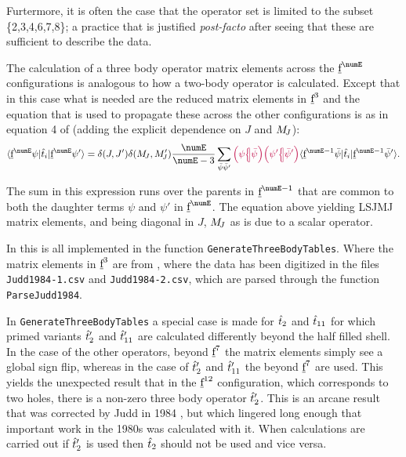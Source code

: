 \documentclass{article}
\newcommand{\codetext}[1]{{\color{BlueViolet} \texttt{#1}}}
\begin{document}
Furtermore, it is often the case that the operator set is limited to the subset \{2,3,4,6,7,8\}; a practice that is justified \textit{post-facto} after seeing that these are sufficient to describe the data.

The calculation of a three body operator matrix elements across the $\forb^{\numE}$ configurations is analogous to how a two-body operator is calculated. Except that in this case what is needed are the reduced matrix elements in $\underbar{$\text{f}$}^3$ and the equation that is used to propagate these across the other configurations is as in equation 4 of \cite{judd_three-particle_1966} (adding the explicit dependence on $J$ and $M_{\!{J}}$):
\begin{equation} 
	\braopket{\forb^{\numE}\psi}
		{\op{t}_i}
		{\forb^{\numE}\psi'} =
		\kronecker{J}{J'}
		\kronecker{\Msub{J}}{\Msub{J}'} 
		\frac{\numE}{\numE-3} 
		\sum_{\bar{\psi}\bar{\psi}'}
			\cfpinv{\psi}{\bar{\psi}}
        	\cfpinv{\psi'}{\bar{\psi}'}
        	\braopket{\forb^{\numE-1}\bar{\psi}}{\op{t}_i}{\forb^{\numE-1}\bar{\psi}'}.
\label{eqn:three body escalator}
\end{equation}

The sum in this expression runs over the parents in $\forb^{\numE-1}$ that are common to both the daughter terms $\psi$ and $\psi'$ in $\forb^{\numE}$. The equation above yielding LSJMJ matrix elements, and being diagonal in $J$, $M_{\!{J}}$ as is due to a scalar operator.

In \qlanth this is all implemented in the function \codetext{GenerateThreeBodyTables}. Where the matrix elements in $\underbar{$\text{f}$}^3$ are from \cite{judd_complete_1984}, where the data has been digitized in the files \codetext{Judd1984-1.csv} and \codetext{Judd1984-2.csv}, which are parsed through the function \codetext{ParseJudd1984}.
 
 In \codetext{GenerateThreeBodyTables} a special case is made for $\hat{t}_2$ and $\hat{t}_{11}$ for which primed variants $\hat{t}_2'$ and $\hat{t}_{11}'$ are calculated differently beyond the half filled shell. In the case of the other operators, beyond $\underbar{$\text{f}$}^7$ the matrix elements simply see a global sign flip, whereas in the case of $\hat{t}_2'$ and $\hat{t}_{11}'$ the \cfps beyond $\underbar{$\text{f}$}^7$ are used. This yields the unexpected result that in the $\underbar{$\text{f}$}^{12}$ configuration, which corresponds to two holes, there is a non-zero three body operator $\hat{t}_2'$. This is an arcane result that was corrected by Judd in 1984 \cite{judd_complete_1984}, but which lingered long enough that important work in the 1980s was calculated with it. When calculations are carried out if $\hat{t}_2'$ is used then $\hat{t}_2$ should not be used and vice versa.
 
\end{document}
